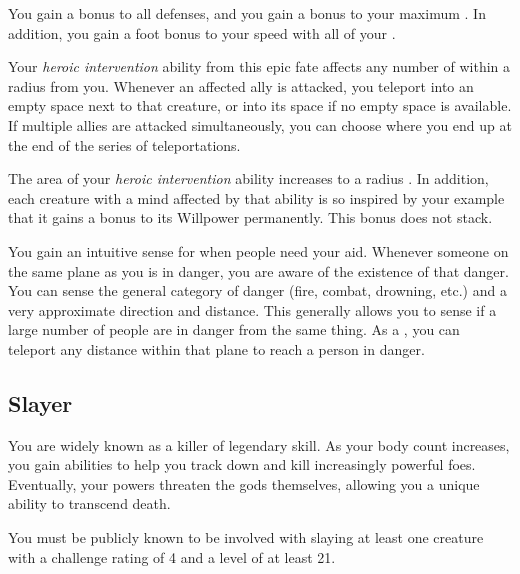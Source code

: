              You gain a  bonus to all defenses, and you gain a  bonus to your maximum .
            In addition, you gain a  foot bonus to your speed with all of your .

             Your \textit{heroic intervention} ability from this epic fate affects any number of  within a \areamed radius  from you.
            Whenever an affected ally is attacked, you teleport into an empty space next to that creature, or into its space if no empty space is available.
            If multiple allies are attacked simultaneously, you can choose where you end up at the end of the series of teleportations.

             The area of your \textit{heroic intervention} ability increases to a \areagarg radius .
            In addition, each creature with a mind affected by that ability is so inspired by your example that it gains a  bonus to its Willpower permanently.
            This bonus does not stack.

             You gain an intuitive sense for when people need your aid.
            Whenever someone on the same plane as you is in danger, you are aware of the existence of that danger.
            You can sense the general category of danger (fire, combat, drowning, etc.) and a very approximate direction and distance.
            This generally allows you to sense if a large number of people are in danger from the same thing.
            As a , you can teleport any distance within that plane to reach a person in danger.

    \subsection{Slayer}
        You are widely known as a killer of legendary skill.
        As your body count increases, you gain abilities to help you track down and kill increasingly powerful foes.
        Eventually, your powers threaten the gods themselves, allowing you a unique ability to transcend death.

         You must be publicly known to be involved with slaying at least one creature with a challenge rating of 4 and a level of at least 21.

